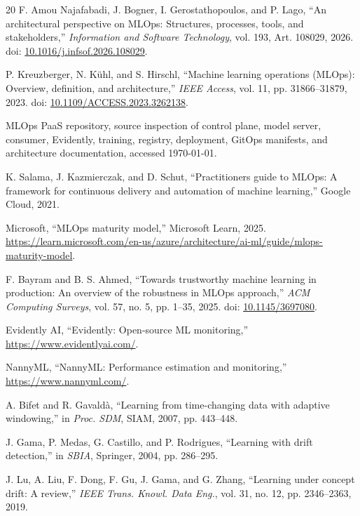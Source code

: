 \clearpage
\begin{thebibliography}{20}
F. Amou Najafabadi, J. Bogner, I. Gerostathopoulos, and P. Lago,
``An architectural perspective on MLOps: Structures, processes, tools, and stakeholders,''
\emph{Information and Software Technology}, vol. 193, Art. 108029, 2026.
doi: \href{https://doi.org/10.1016/j.infsof.2026.108029}{10.1016/j.infsof.2026.108029}.

P. Kreuzberger, N. K\"{u}hl, and S. Hirschl,
``Machine learning operations (MLOps): Overview, definition, and architecture,''
\emph{IEEE Access}, vol. 11, pp. 31866--31879, 2023.
doi: \href{https://doi.org/10.1109/ACCESS.2023.3262138}{10.1109/ACCESS.2023.3262138}.

MLOps PaaS repository, source inspection of control plane, model server, consumer, Evidently, training, registry, deployment, GitOps manifests, and architecture documentation, accessed \today.

K. Salama, J. Kazmierczak, and D. Schut,
``Practitioners guide to MLOps: A framework for continuous delivery and automation of machine learning,'' Google Cloud, 2021.

Microsoft, ``MLOps maturity model,'' Microsoft Learn, 2025.
\url{https://learn.microsoft.com/en-us/azure/architecture/ai-ml/guide/mlops-maturity-model}.

F. Bayram and B. S. Ahmed,
``Towards trustworthy machine learning in production: An overview of the robustness in MLOps approach,''
\emph{ACM Computing Surveys}, vol. 57, no. 5, pp. 1--35, 2025.
doi: \href{https://doi.org/10.1145/3697080}{10.1145/3697080}.

Evidently AI, ``Evidently: Open-source ML monitoring,'' \url{https://www.evidentlyai.com/}.

NannyML, ``NannyML: Performance estimation and monitoring,'' \url{https://www.nannyml.com/}.

A. Bifet and R. Gavald\`{a},
``Learning from time-changing data with adaptive windowing,''
in \emph{Proc. SDM}, SIAM, 2007, pp. 443--448.

J. Gama, P. Medas, G. Castillo, and P. Rodrigues,
``Learning with drift detection,''
in \emph{SBIA}, Springer, 2004, pp. 286--295.

J. Lu, A. Liu, F. Dong, F. Gu, J. Gama, and G. Zhang,
``Learning under concept drift: A review,''
\emph{IEEE Trans. Knowl. Data Eng.}, vol. 31, no. 12, pp. 2346--2363, 2019.


\end{thebibliography}
